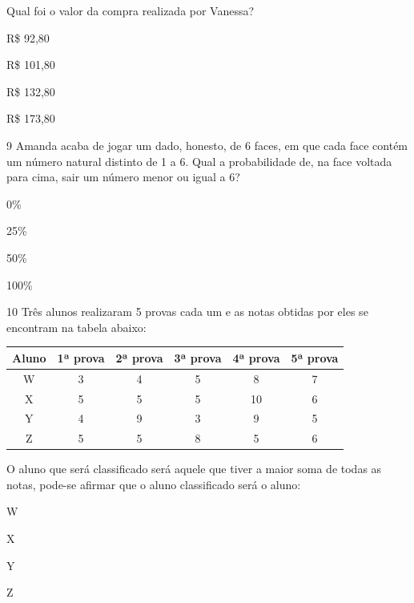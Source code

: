 Qual foi o valor da compra realizada por Vanessa?

\begin{minipage}{.5\textwidth}
\begin{escolha}
\item
  R\$ 92,80
\item
  R\$ 101,80
\item
  R\$ 132,80
\item
  R\$ 173,80
\end{escolha}
\end{minipage}


\pagebreak
\num{9} Amanda acaba de jogar um dado, honesto, de 6 faces, em que cada
face contém um número natural distinto de 1 a 6. Qual a probabilidade de,
na face voltada para cima, sair um número menor ou igual a 6?

\begin{minipage}{.5\textwidth}
\begin{escolha}
\item
  0\%
\item
  25\%
\item
  50\%
\item
  100\%
\end{escolha}
\end{minipage}


\num{10} Três alunos realizaram 5 provas cada um e as notas obtidas por
eles se encontram na tabela abaixo:

\begin{center}
\begin{tabular}{c|ccccc}
\hline
\multicolumn{1}{l|}{\textbf{Aluno}} & \multicolumn{1}{l}{\textbf{1ª prova}} & \multicolumn{1}{l}{\textbf{2ª prova}} & \multicolumn{1}{l}{\textbf{3ª prova}} & \multicolumn{1}{l}{\textbf{4ª prova}} & \multicolumn{1}{l}{\textbf{5ª prova}} \\ \hline
W & 3 & 4 & 5 & 8 & 7 \\ \hline
X & 5 & 5 & 5 & 10 & 6 \\ \hline
Y & 4 & 9 & 3 & 9 & 5 \\ \hline
Z & 5 & 5 & 8 & 5 & 6 \\ \hline
\end{tabular}
\end{center}

O aluno que será classificado será aquele que tiver a maior
soma de todas as notas, pode-se afirmar que o aluno classificado será o
aluno:

\begin{minipage}{.5\textwidth}
\begin{escolha}
\item
  W
\item
  X
\item
  Y
\item
  Z
\end{escolha}
\end{minipage}


